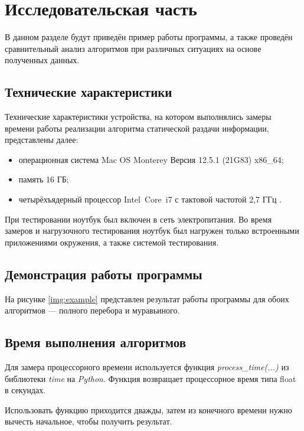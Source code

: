 \chapter{Исследовательская часть}

В данном разделе будут приведён пример работы программы, а также проведён сравнительный анализ алгоритмов при различных ситуациях на основе полученных данных.

\section{Технические характеристики}

Технические характеристики устройства, на котором выполнялись замеры времени работы реализации алгоритма статической раздачи информации, представлены далее:

\begin{itemize}
	\item операционная система Mac OS Monterey Версия 12.5.1 (21G83) \cite{macos} x86\_64;
	\item память 16 ГБ;
	\item четырёхъядерный процессор Intel Core i7 с тактовой частотой 2,7 ГГц \cite{intel}.
\end{itemize}

При тестировании ноутбук был включен в сеть электропитания. Во время замеров и нагрузочного тестирования ноутбук был нагружен только встроенными приложениями окружения, а также системой тестирования.

\section{Демонстрация работы программы}

На рисунке \ref{img:example} представлен результат работы программы для обоих алгоритмов --- полного перебора и муравьиного.

\clearpage

\section{Время выполнения алгоритмов}

Для замера процессорного времени используется функция \textit{process\_time(...)} из библиотеки \textit{time} на \textit{Python}. Функция возвращает процессорное время типа float в секундах.

Использовать функцию приходится дважды, затем из конечного времени нужно вычесть начальное, чтобы получить результат.

